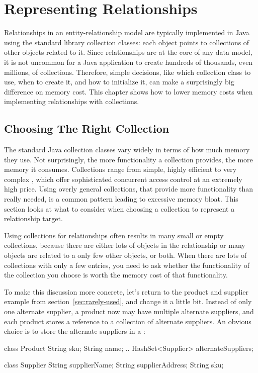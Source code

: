 \chapter{Representing Relationships}
\label{chapter:representing-relationships}

Relationships in an
entity-relationship model are typically implemented in Java using the
standard library collection classes:
each object points to collections of other objects related to it.
Since relationships are at the core of any data model, it
 is not uncommon for a Java application to create hundreds of
thousands, even millions, of collections. Therefore, simple decisions, like
which collection class to use, when to create it, and how to initialize it,
can make a surprisingly big difference on memory cost.
This chapter shows
 how to lower memory costs when implementing relationships with collections.
 
 \section{Choosing The Right Collection}

The standard Java collection classes vary widely in terms of how much memory they use.
Not surprisingly, the more functionality a collection provides, the more
memory it consumes. Collections range from simple, highly efficient
 to very complex
, which offer sophisticated concurrent access
control at an extremely high price. 
Using overly general collections, that provide more functionality than
really needed, is a common pattern leading to excessive memory bloat.
This section looks at what to consider when choosing a collection to
represent a relationship target. 

Using collections for relationships often results in many small or empty
collections, because there are either lots of objects in the relationship or
 many objects are related to a only few other objects, or both. When there
are lots of collections with only a few entries, you need to ask  whether the
functionality of the collection you choose is worth the memory cost of that
functionality.

To make this discussion more concrete, let's return to the product and supplier example 
from section~\ref{sec:rarely-used}, and change it a little
 bit. Instead of only one alternate supplier, a product now may have multiple
 alternate suppliers, and each product stores a reference to a collection of alternate suppliers. An obvious choice is
 to store the alternate suppliers in a :
 \begin{shortlisting} 
class Product {
	String sku;
	String name;
	.. 
	HashSet<Supplier> alternateSuppliers;
}

class Supplier {
	String supplierName;
	String supplierAddress;
	String sku;
}
\end{shortlisting}
 

